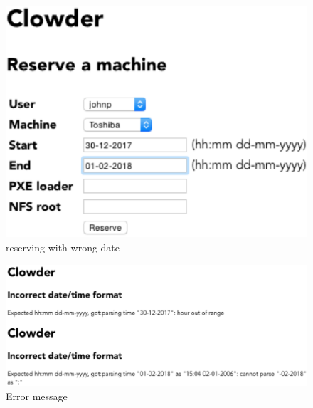 \begin{figure}
\includegraphics[width=\linewidth]{dateformat1.eps}
\caption{reserving with wrong date}
\end{figure}

\begin{figure}
\includegraphics[width=\linewidth]{dateformat2.eps}
\caption{Error message}
\label{error}
\end{figure}

